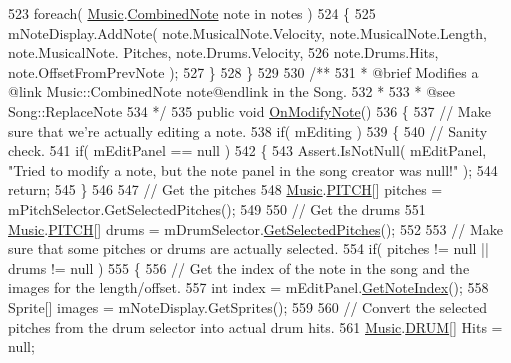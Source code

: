 \begin{DoxyCodeInclude}
523         \textcolor{keywordflow}{foreach}( \hyperlink{class_music}{Music}.\hyperlink{group___music_structs_struct_music_1_1_combined_note}{CombinedNote} note in notes )
524         \{
525             mNoteDisplay.AddNote( note.MusicalNote.Velocity, note.MusicalNote.Length, note.MusicalNote.
      Pitches, note.Drums.Velocity,
526                 note.Drums.Hits, note.OffsetFromPrevNote );
527         \}
528     \}
529 \textcolor{comment}{}
530 \textcolor{comment}{    /**}
531 \textcolor{comment}{     * @brief Modifies a @link Music::CombinedNote note@endlink in the Song.}
532 \textcolor{comment}{     * }
533 \textcolor{comment}{     * @see Song::ReplaceNote}
534 \textcolor{comment}{    */}
535     \textcolor{keyword}{public} \textcolor{keywordtype}{void} \hyperlink{group___s_c_m_handlers_gaf12d6326ad2175a51f688504372be784}{OnModifyNote}()
536     \{
537         \textcolor{comment}{// Make sure that we're actually editing a note.}
538         \textcolor{keywordflow}{if}( mEditing )
539         \{
540             \textcolor{comment}{// Sanity check.}
541             \textcolor{keywordflow}{if}( mEditPanel == null )
542             \{
543                 Assert.IsNotNull( mEditPanel, \textcolor{stringliteral}{"Tried to modify a note, but the note panel in the song
       creator was null!"} );
544                 \textcolor{keywordflow}{return};
545             \}
546 
547             \textcolor{comment}{// Get the pitches }
548             \hyperlink{class_music}{Music}.\hyperlink{group___music_enums_ga508f69b199ea518f935486c990edac1d}{PITCH}[] pitches = mPitchSelector.GetSelectedPitches();
549 
550             \textcolor{comment}{// Get the drums}
551             \hyperlink{class_music}{Music}.\hyperlink{group___music_enums_ga508f69b199ea518f935486c990edac1d}{PITCH}[] drums = mDrumSelector.\hyperlink{group___s_c___p_s_c_pub_func_ga05750cc6e1199f1522f8b87d6579dc34}{GetSelectedPitches}();
552 
553             \textcolor{comment}{// Make sure that some pitches or drums are actually selected.}
554             \textcolor{keywordflow}{if}( pitches != null || drums != null )
555             \{
556                 \textcolor{comment}{// Get the index of the note in the song and the images for the length/offset.}
557                 \textcolor{keywordtype}{int} index = mEditPanel.\hyperlink{group___s_c___n_d_p_unity_ga8beef050026ade4ba4ccb574c414d24e}{GetNoteIndex}();
558                 Sprite[] images = mNoteDisplay.GetSprites();
559 
560                 \textcolor{comment}{// Convert the selected pitches from the drum selector into actual drum hits.}
561                 \hyperlink{class_music}{Music}.\hyperlink{group___music_enums_gade475b4382c7066d1af13e7c13c029b6}{DRUM}[] Hits = null;

\end{DoxyCodeInclude}
